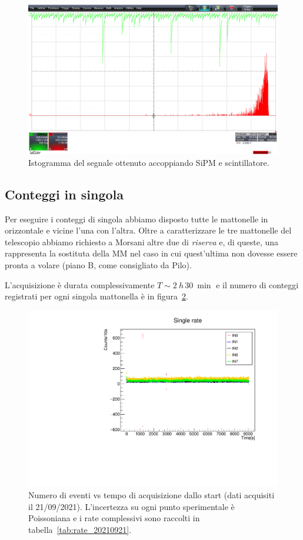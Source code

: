 \documentclass[11pt,a4paper]{article}
\begin{document}
    \begin{figure}[ht!]
        \centering
        \includegraphics[scale=0.3]{Immagini/signal}
        \caption{Istogramma del segnale ottenuto accoppiando SiPM e scintillatore.}
        \label{fig:signal}
    \end{figure}
    \subsection{Conteggi in singola}\label{subsec:conteggi-in-singola}
    Per eseguire i conteggi di singola abbiamo disposto tutte le mattonelle in orizzontale e vicine l'una con l'altra.
    Oltre a caratterizzare le tre mattonelle del telescopio abbiamo richiesto a Morsani altre due di \textit{riserva} e, di queste, una rappresenta la sostituta della MM nel caso in cui quest'ultima non dovesse essere pronta a volare (piano B, come consigliato da Pilo).

    L'acquisizione è durata complessivamente $T\sim \SI{2}{h}\, \SI{30}{\min}$ e il numero di conteggi registrati per ogni singola mattonella è in figura~\ref{fig:rate_20210921}.

    \begin{figure}[ht!]
        \centering
        \includegraphics[scale=0.5]{Immagini/single_rate_20210921}
        \caption{Numero di eventi vs tempo di acquisizione dallo start (dati acquisiti il 21/09/2021). L'incertezza su ogni punto sperimentale è Poissoniana e i rate complessivi sono raccolti in tabella~\ref{tab:rate_20210921}.}
        \label{fig:rate_20210921}
    \end{figure}
\end{document}
